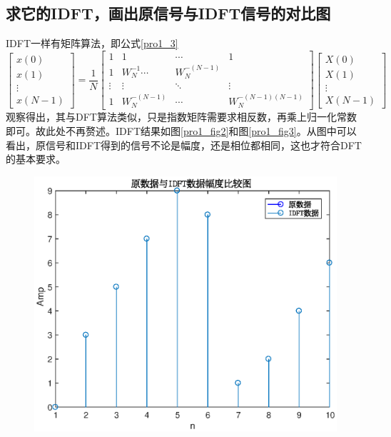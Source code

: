 \documentclass[UTF8]{article}
\begin{document}
\begin{CJK}{UTF8}{gkai}
\subsection{求它的IDFT，画出原信号与IDFT信号的对比图}
IDFT一样有矩阵算法，即公式\ref{pro1_3}
\begin{equation}
\left[\begin{array}{c}
x(0)\\
x(1)\\
\vdots\\
x(N-1)
\end{array}\right]
=
\frac{1}{N}
\left[\begin{array}{cccc}
1 & 1 & \cdots & 1\\
1 & W_N^{-1} \cdots & W_N^{-(N-1)}\\
\vdots&\vdots&\ddots&\vdots\\
1 & W_N^{-(N-1)} & \cdots & W_N^{-(N-1)(N-1)}
\end{array}
\right]
\left[
\begin{array}{c}
  X(0)\\
  X(1)\\
  \vdots\\
  X(N-1)
\end{array}
\right]\label{pro1_3}
\end{equation}
观察得出，其与DFT算法类似，只是指数矩阵需要求相反数，再乘上归一化常数即可。故此处不再赘述。IDFT结果如图\ref{pro1_fig2}和图\ref{pro1_fig3}。从图中可以看出，原信号和IDFT得到的信号不论是幅度，还是相位都相同，这也才符合DFT的基本要求。
\begin{figure}
  \centering
  \includegraphics[scale=0.5]{pro1_subpro2_amp.eps}

\end{figure}
\end{CJK}
\end{document}
